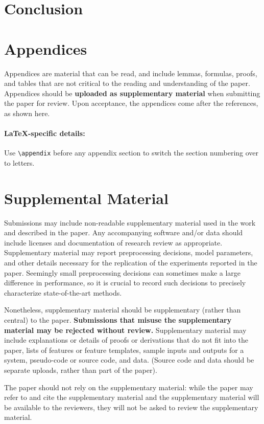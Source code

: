 \documentclass[11pt,a4paper]{article}
\begin{document}
\section{Conclusion}




\appendix

\section{Appendices}
\label{sec:appendix}
Appendices are material that can be read, and include lemmas, formulas, proofs, and tables that are not critical to the reading and understanding of the paper. 
Appendices should be \textbf{uploaded as supplementary material} when submitting the paper for review.
Upon acceptance, the appendices come after the references, as shown here.

\paragraph{\LaTeX-specific details:}
Use {\small\verb|\appendix|} before any appendix section to switch the section numbering over to letters.


\section{Supplemental Material}
\label{sec:supplemental}
Submissions may include non-readable supplementary material used in the work and described in the paper.
Any accompanying software and/or data should include licenses and documentation of research review as appropriate.
Supplementary material may report preprocessing decisions, model parameters, and other details necessary for the replication of the experiments reported in the paper.
Seemingly small preprocessing decisions can sometimes make a large difference in performance, so it is crucial to record such decisions to precisely characterize state-of-the-art methods. 

Nonetheless, supplementary material should be supplementary (rather than central) to the paper.
\textbf{Submissions that misuse the supplementary material may be rejected without review.}
Supplementary material may include explanations or details of proofs or derivations that do not fit into the paper, lists of
features or feature templates, sample inputs and outputs for a system, pseudo-code or source code, and data.
(Source code and data should be separate uploads, rather than part of the paper).

The paper should not rely on the supplementary material: while the paper may refer to and cite the supplementary material and the supplementary material will be available to the reviewers, they will not be asked to review the supplementary material.
\end{document}
